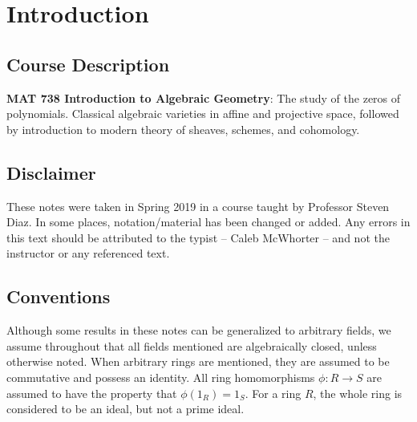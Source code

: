 \newpage
\section{Introduction}
\subsection{Course Description}

\textbf{MAT 738  Introduction to Algebraic Geometry}: The study of the zeros of polynomials. Classical algebraic varieties in affine and projective space, followed by introduction to modern theory of sheaves, schemes, and cohomology.


\subsection{Disclaimer}

These notes were taken in Spring 2019 in a course taught by Professor Steven Diaz. In some places, notation/material has been changed or added. Any errors in this text should be attributed to the typist -- Caleb McWhorter -- and not the instructor or any referenced text. 


\subsection{Conventions}

Although some results in these notes can be generalized to arbitrary fields, we assume throughout that all fields mentioned are algebraically closed, unless otherwise noted. When arbitrary rings are mentioned, they are assumed to be commutative and possess an identity. All ring homomorphisms $\phi: R \to S$ are assumed to have the property that $\phi(1_R)=1_S$. For a ring $R$, the whole ring is considered to be an ideal, but not a prime ideal. 
































